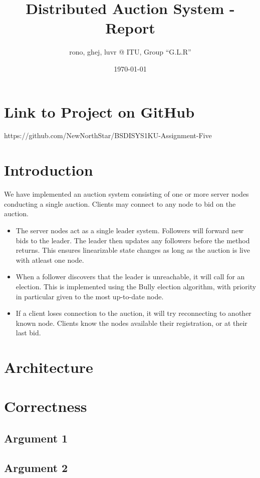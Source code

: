 \documentclass[a4paper,11pt]{article}
\title{Distributed Auction System - Report}
\author{rono, ghej, luvr @ ITU, Group ``G.L.R''}
\date{\today}
\begin{document}
\maketitle

\tableofcontents

\pagebreak

\section{Link to Project on GitHub}
https://github.com/NewNorthStar/BSDISYS1KU-Assignment-Five

\section{Introduction}

We have implemented an auction system consisting of one or more server nodes conducting a single auction. Clients may connect to any node to bid on the auction. 

\begin{itemize}
    \item The server nodes act as a single leader system. Followers will forward new bids to the leader. The leader then updates any followers before the method returns. This ensures linearizable state changes as long as the auction is live with atleast one node. 
    \item When a follower discovers that the leader is unreachable, it will call for an election. This is implemented using the Bully election algorithm, with priority in particular given to the most up-to-date node.
    \item If a client loses connection to the auction, it will try reconnecting to another known node. Clients know the nodes available their registration, or at their last bid. 
\end{itemize}

\section{Architecture}

\section{Correctness}

\subsection{Argument 1}

\subsection{Argument 2}
\end{document}
